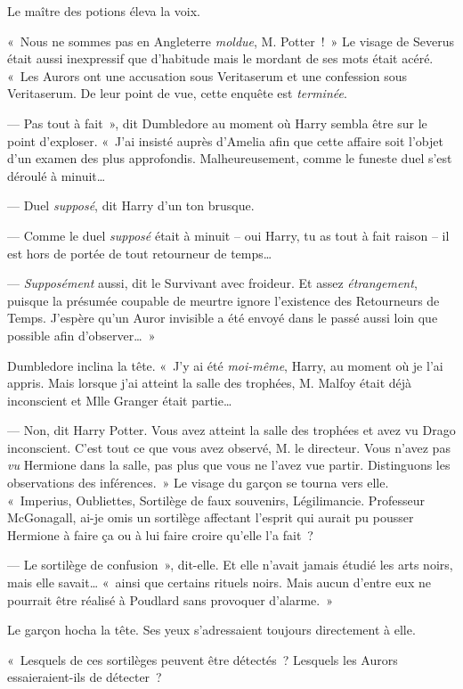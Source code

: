 Le maître des potions éleva la voix.

«~Nous ne sommes pas en Angleterre \emph{moldue}, M. Potter~!~» Le visage de Severus était aussi inexpressif que d'habitude mais le mordant de ses mots était acéré. «~Les Aurors ont une accusation sous Veritaserum et une confession sous Veritaserum. De leur point de vue, cette enquête est \emph{terminée}.

--- Pas tout à fait~», dit Dumbledore au moment où Harry sembla être sur le point d'exploser. «~J'ai insisté auprès d'Amelia afin que cette affaire soit l'objet d'un examen des plus approfondis. Malheureusement, comme le funeste duel s'est déroulé à minuit…

--- Duel \emph{supposé}, dit Harry d'un ton brusque.

--- Comme le duel \emph{supposé} était à minuit -- oui Harry, tu as tout à fait raison -- il est hors de portée de tout retourneur de temps…

--- \emph{Supposément} aussi, dit le Survivant avec froideur. Et assez \emph{étrangement}, puisque la présumée coupable de meurtre ignore l'existence des Retourneurs de Temps. J'espère qu'un Auror invisible a été envoyé dans le passé aussi loin que possible afin d'observer…~»

Dumbledore inclina la tête. «~J'y ai été \emph{moi-même}, Harry, au moment où je l'ai appris. Mais lorsque j'ai atteint la salle des trophées, M. Malfoy était déjà inconscient et Mlle Granger était partie…

--- Non, dit Harry Potter. Vous avez atteint la salle des trophées et avez vu Drago inconscient. C'est tout ce que vous avez observé, M. le directeur. Vous n'avez pas \emph{vu} Hermione dans la salle, pas plus que vous ne l'avez vue partir. Distinguons les observations des inférences.~» Le visage du garçon se tourna vers elle. «~Imperius, Oubliettes, Sortilège de faux souvenirs, Légilimancie. Professeur McGonagall, ai-je omis un sortilège affectant l'esprit qui aurait pu pousser Hermione à faire ça ou à lui faire croire qu'elle l'a fait~?

--- Le sortilège de confusion~», dit-elle. Et elle n'avait jamais étudié les arts noirs, mais elle savait… «~ainsi que certains rituels noirs. Mais aucun d'entre eux ne pourrait être réalisé à Poudlard sans provoquer d'alarme.~»

Le garçon hocha la tête. Ses yeux s'adressaient toujours directement à elle.

«~Lesquels de ces sortilèges peuvent être détectés~? Lesquels les Aurors essaieraient-ils de détecter~?

